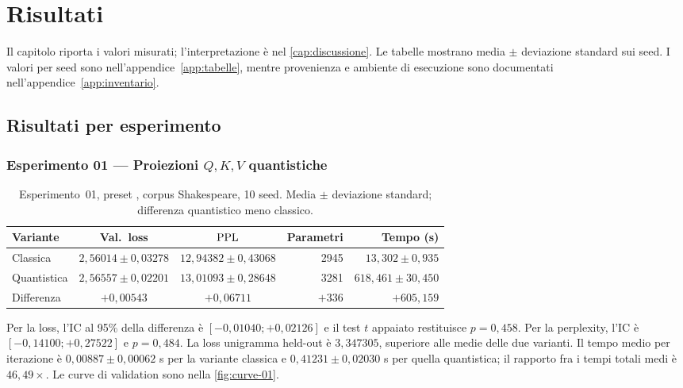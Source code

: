 \chapter{Risultati}
\label{cap:risultati}

Il capitolo riporta i valori misurati; l'interpretazione è nel
\cref{cap:discussione}. Le tabelle mostrano media $\pm$ deviazione standard sui
seed. I valori per seed sono nell'appendice~\ref{app:tabelle}, mentre provenienza
e ambiente di esecuzione sono documentati nell'appendice~\ref{app:inventario}.
\convsegno{}

\section{Risultati per esperimento}
\label{sec:risultati-per-esperimento}

\subsection{Esperimento 01 --- Proiezioni \texorpdfstring{$Q,K,V$}{Q,K,V} quantistiche}

\begin{table}[htbp]
\centering
\caption[Esperimento 01: loss di validation e perplexity]{%
Esperimento~01, preset , corpus Shakespeare, 10 seed.
Media $\pm$ deviazione standard; differenza quantistico meno classico.}
\label{tab:risultati-01}
\small
\begin{tabular}{@{}l c c r r@{}}
\toprule
\textbf{Variante} & \textbf{Val.\ loss} & $\mathrm{PPL}$ & \textbf{Parametri} & \textbf{Tempo (s)} \\
\midrule
Classica    & $2{,}56014 \pm 0{,}03278$ & $12{,}94382 \pm 0{,}43068$ & 2945 & $13{,}302 \pm 0{,}935$ \\
Quantistica & $2{,}56557 \pm 0{,}02201$ & $13{,}01093 \pm 0{,}28648$ & 3281 & $618{,}461 \pm 30{,}450$ \\
\midrule
Differenza  & $+0{,}00543$ & $+0{,}06711$ & $+336$ & $+605{,}159$ \\
\bottomrule
\end{tabular}
\end{table}

Per la loss, l'IC al 95\% della differenza è
$[-0{,}01040;+0{,}02126]$ e il test $t$ appaiato restituisce $p=0{,}458$. Per la
perplexity, l'IC è $[-0{,}14100;+0{,}27522]$ e $p=0{,}484$. La loss unigramma
held-out è $3{,}347305$, superiore alle medie delle due varianti. Il tempo medio per iterazione è
$0{,}00887 \pm 0{,}00062$ s per la variante classica e
$0{,}41231 \pm 0{,}02030$ s per quella quantistica; il rapporto fra i tempi
totali medi è $46{,}49\times$. Le curve di validation sono nella
\cref{fig:curve-01}.

